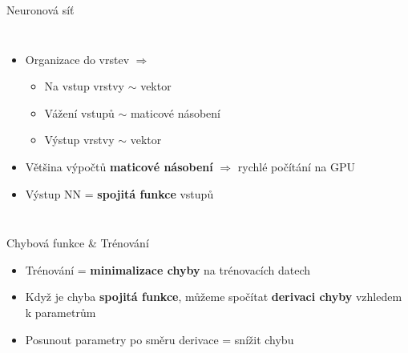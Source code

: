 \documentclass[handout,aspectratio=169,dvipsnames]{beamer}
\begin{document}
\begin{frame}{Neuronová síť}

    \begin{columns}

        \scalebox{.75}{}

        \begin{itemize}[<+->]

            \item Organizace do vrstev $\Rightarrow$

            \begin{itemize}[<+->]

                \item Na vstup vrstvy $\sim$ vektor

                \item Vážení vstupů $\sim$ maticové násobení

                \item Výstup vrstvy $\sim$ vektor

            \end{itemize}

        \item Většina výpočtů \textbf{maticové násobení} $\Rightarrow$ rychlé počítání
            na GPU

        \item Výstup NN = \textbf{spojitá funkce} vstupů

        \end{itemize}
    \end{columns}

\end{frame}


\begin{frame}{Chybová funkce \& Trénování}

    \begin{itemize}[<+->]

        \item Trénování = \textbf{minimalizace chyby} na trénovacích datech

        \item Když je chyba \textbf{spojitá funkce}, můžeme spočítat
            \textbf{derivaci chyby} vzhledem k parametrům

        \item Posunout parametry po směru derivace = snížit chybu

    \end{itemize}

\end{frame}
\end{document}
